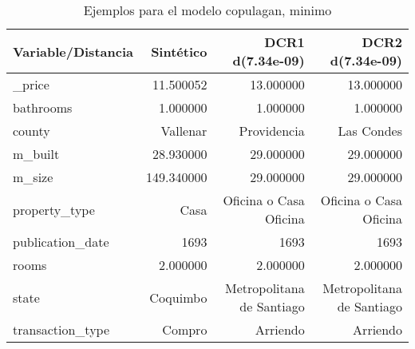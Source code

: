 \begin{table}[H]
\centering
\fontsize{10}{14}\selectfont
\caption{Ejemplos para el modelo copulagan, minimo}
\label{table-example-economicos-a-1-copulagan-min}
\begin{tabular}{|l|r|r|r|}
\hline
\rowcolor[gray]{0.8}
Variable/Distancia & Sintético & DCR1 d(7.34e-09) & DCR2 d(7.34e-09) \\
\hline \_price & \cellcolor[rgb]{0.9, 0.54, 0.52} 11.500052 & 13.000000 & 13.000000 \\
\hline bathrooms & \cellcolor[rgb]{0.9, 0.54, 0.52} 1.000000 & \cellcolor[rgb]{0.9, 0.54, 0.52} 1.000000 & \cellcolor[rgb]{0.9, 0.54, 0.52} 1.000000 \\
\hline county & \cellcolor[rgb]{0.9, 0.54, 0.52} Vallenar & Providencia & Las Condes \\
\hline m\_built & \cellcolor[rgb]{0.9, 0.54, 0.52} 28.930000 & 29.000000 & 29.000000 \\
\hline m\_size & \cellcolor[rgb]{0.9, 0.54, 0.52} 149.340000 & 29.000000 & 29.000000 \\
\hline property\_type & \cellcolor[rgb]{0.9, 0.54, 0.52} Casa & Oficina o Casa Oficina & Oficina o Casa Oficina \\
\hline publication\_date & \cellcolor[rgb]{0.9, 0.54, 0.52} 1693 & \cellcolor[rgb]{0.9, 0.54, 0.52} 1693 & \cellcolor[rgb]{0.9, 0.54, 0.52} 1693 \\
\hline rooms & \cellcolor[rgb]{0.9, 0.54, 0.52} 2.000000 & \cellcolor[rgb]{0.9, 0.54, 0.52} 2.000000 & \cellcolor[rgb]{0.9, 0.54, 0.52} 2.000000 \\
\hline state & \cellcolor[rgb]{0.9, 0.54, 0.52} Coquimbo & Metropolitana de Santiago & Metropolitana de Santiago \\
\hline transaction\_type & \cellcolor[rgb]{0.9, 0.54, 0.52} Compro & Arriendo & Arriendo \\
\hline
\end{tabular}
\end{table}
